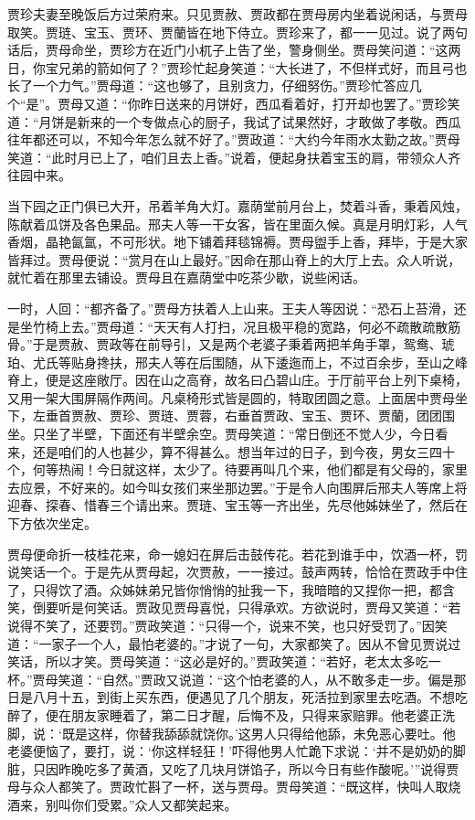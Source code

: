 \documentclass[12pt,oneside]{book}
\begin{document}
贾珍夫妻至晚饭后方过荣府来。只见贾赦、贾政都在贾母房内坐着说闲话，与贾母取笑。贾琏、宝玉、贾环、贾蘭皆在地下侍立。贾珍来了，都一一见过。说了两句话后，贾母命坐，贾珍方在近门小杌子上告了坐，警身侧坐。贾母笑问道：“这两日，你宝兄弟的箭如何了？”贾珍忙起身笑道：“大长进了，不但样式好，而且弓也长了一个力气。”贾母道：“这也够了，且别贪力，仔细努伤。”贾珍忙答应几个“是”。贾母又道：“你昨日送来的月饼好，西瓜看着好，打开却也罢了。”贾珍笑道：“月饼是新来的一个专做点心的厨子，我试了试果然好，才敢做了孝敬。西瓜往年都还可以，不知今年怎么就不好了。”贾政道：“大约今年雨水太勤之故。”贾母笑道：“此时月已上了，咱们且去上香。”说着，便起身扶着宝玉的肩，带领众人齐往园中来。

当下园之正门俱已大开，吊着羊角大灯。嘉荫堂前月台上，焚着斗香，秉着风烛，陈献着瓜饼及各色果品。邢夫人等一干女客，皆在里面久候。真是月明灯彩，人气香烟，晶艳氤氲，不可形状。地下铺着拜毯锦褥。贾母盥手上香，拜毕，于是大家皆拜过。贾母便说：“赏月在山上最好。”因命在那山脊上的大厅上去。众人听说，就忙着在那里去铺设。贾母且在嘉荫堂中吃茶少歇，说些闲话。

一时，人回：“都齐备了。”贾母方扶着人上山来。王夫人等因说：“恐石上苔滑，还是坐竹椅上去。”贾母道：“天天有人打扫，况且极平稳的宽路，何必不疏散疏散筋骨。”于是贾赦、贾政等在前导引，又是两个老婆子秉着两把羊角手罩，鸳鸯、琥珀、尤氏等贴身搀扶，邢夫人等在后围随，从下逶迤而上，不过百余步，至山之峰脊上，便是这座敞厅。因在山之高脊，故名曰凸碧山庄。于厅前平台上列下桌椅，又用一架大围屏隔作两间。凡桌椅形式皆是圆的，特取团圆之意。上面居中贾母坐下，左垂首贾赦、贾珍、贾琏、贾蓉，右垂首贾政、宝玉、贾环、贾蘭，团团围坐。只坐了半壁，下面还有半壁余空。贾母笑道：“常日倒还不觉人少，今日看来，还是咱们的人也甚少，算不得甚么。想当年过的日子，到今夜，男女三四十个，何等热闹！今日就这样，太少了。待要再叫几个来，他们都是有父母的，家里去应景，不好来的。如今叫女孩们来坐那边罢。”于是令人向围屏后邢夫人等席上将迎春、探春、惜春三个请出来。贾琏、宝玉等一齐出坐，先尽他姊妹坐了，然后在下方依次坐定。

贾母便命折一枝桂花来，命一媳妇在屏后击鼓传花。若花到谁手中，饮酒一杯，罚说笑话一个。于是先从贾母起，次贾赦，一一接过。鼓声两转，恰恰在贾政手中住了，只得饮了酒。众姊妹弟兄皆你悄悄的扯我一下，我暗暗的又捏你一把，都含笑，倒要听是何笑话。贾政见贾母喜悦，只得承欢。方欲说时，贾母又笑道：“若说得不笑了，还要罚。”贾政笑道：“只得一个，说来不笑，也只好受罚了。”因笑道：“一家子一个人，最怕老婆的。”才说了一句，大家都笑了。因从不曾见贾说过笑话，所以才笑。贾母笑道：“这必是好的。”贾政笑道：“若好，老太太多吃一杯。”贾母笑道：“自然。”贾政又说道：“这个怕老婆的人，从不敢多走一步。偏是那日是八月十五，到街上买东西，便遇见了几个朋友，死活拉到家里去吃酒。不想吃醉了，便在朋友家睡着了，第二日才醒，后悔不及，只得来家赔罪。他老婆正洗脚，说：‘既是这样，你替我舔舔就饶你。’这男人只得给他舔，未免恶心要吐。他老婆便恼了，要打，说：‘你这样轻狂！’吓得他男人忙跪下求说：‘并不是奶奶的脚脏，只因昨晚吃多了黄酒，又吃了几块月饼馅子，所以今日有些作酸呢。’”说得贾母与众人都笑了。贾政忙斟了一杯，送与贾母。贾母笑道：“既这样，快叫人取烧酒来，别叫你们受累。”众人又都笑起来。
\end{document}

